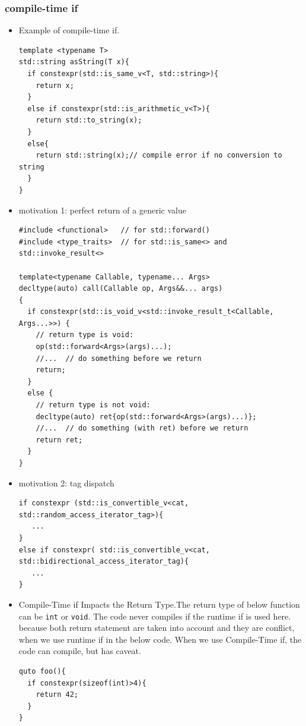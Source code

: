 \documentclass[a4paper,11pt,twoside]{book}
\begin{document}
\subsubsection{compile-time if}
\begin{itemize}
		\item Example of compile-time if.
\begin{lstlisting}
template <typename T>
std::string asString(T x){
  if constexpr(std::is_same_v<T, std::string>){
    return x;
  }
  else if constexpr(std::is_arithmetic_v<T>){
    return std::to_string(x);
  }
  else{
    return std::string(x);// compile error if no conversion to string
  }
}
\end{lstlisting}

		\item motivation 1: perfect return of a generic value
\begin{lstlisting}
#include <functional>   // for std::forward()
#include <type_traits>  // for std::is_same<> and std::invoke_result<>

template<typename Callable, typename... Args>
decltype(auto) call(Callable op, Args&&... args)
{
  if constexpr(std::is_void_v<std::invoke_result_t<Callable, Args...>>) {
    // return type is void:
    op(std::forward<Args>(args)...);
    //...  // do something before we return
    return;
  }
  else {
    // return type is not void:
    decltype(auto) ret{op(std::forward<Args>(args)...)};
    //...  // do something (with ret) before we return
    return ret;
  }
}
\end{lstlisting}

    \item motivation 2: tag dispatch

\begin{lstlisting}
if constexpr (std::is_convertible_v<cat, std::random_access_iterator_tag>){
   ...
}
else if constexpr( std::is_convertible_v<cat, std::bidirectional_access_iterator_tag){
   ...
}
\end{lstlisting}

    \item Compile-Time if Impacts the Return Type.The return type of below function can be \texttt{int} or \texttt{void}. The code never compiles if the runtime if is used here. because both return statement are taken into account and they are conflict, when we use runtime if in the below code. When we use Compile-Time if, the code can compile, but has caveat. 
\begin{lstlisting}
quto foo(){
  if constexpr(sizeof(int)>4){
    return 42;
  }
}
\end{lstlisting}

\end{itemize}
\end{document}
